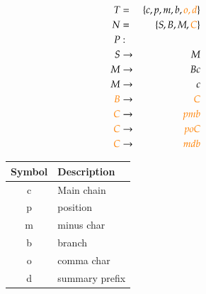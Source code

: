 \documentclass[
fontsize=11pt,
paper=a4,
abstract=true,
numbers=noenddot,
listof=totoc,
bibliography=totoc,
twoside,
open=right,
cleardoublepage=plain,
parskip=half+, %
BCOR=1cm, %
]{scrreprt}
\newcommand{\captionVSpace}{\vspace*{-0.05cm}}
\newcommand{\CFGDefinitionSize}{0.60}
\newcommand{\SymbolDescriptionTable}{0.35}
\newcommand{\colorNew}{orange}
\begin{document}
\begin{figure}[H]
    \begin{minipage}[l]{\CFGDefinitionSize\textwidth}
        $$
        \begin{aligned}
            T &=& \{c, p, m, b, {\color{\colorNew}o, d}\} \\
            N &=& \{S, B, M, {\color{\colorNew}C}\} \\
            P &:& \\
            S &\rightarrow& M \\
            M &\rightarrow& Bc \\
            M &\rightarrow& c \\
            {\color{\colorNew}B} &\rightarrow& {\color{\colorNew}C} \\
            {\color{\colorNew}C} &\rightarrow& {\color{\colorNew}pmb} \\
            {\color{\colorNew}C} &\rightarrow& {\color{\colorNew}poC} \\
            {\color{\colorNew}C} &\rightarrow& {\color{\colorNew}mdb} \\
        \end{aligned}
        $$
        \caption{CFG with multiple branches and same length. Several usage of $C \rightarrow poC$ creates successive positions.}
        \label{fig:CFGWithMultipleBranchesAtTheSameLength}
    \end{minipage}
    \begin{minipage}[r]{\SymbolDescriptionTable\textwidth}
        \begin{table}[H]
        \centering
            \begin{tabular}{c|l}
                \toprule
                \textbf{Symbol} & \textbf{Description} \\
                \midrule
                c & Main chain \\
                p & position \\
                m & minus char \\
                b & branch \\
                o & comma char \\
                d & summary prefix \\
                \bottomrule
            \end{tabular}
        \end{table}
    \end{minipage}
\end{figure}
\end{document}
